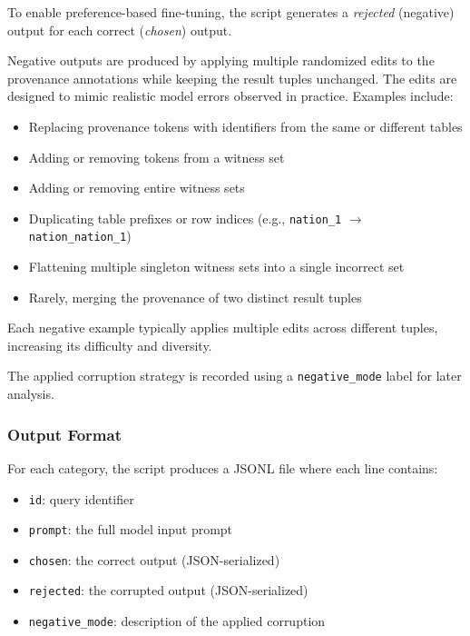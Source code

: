 \documentclass{article}
\begin{document}
To enable preference-based fine-tuning, the script generates a \emph{rejected} (negative) output for each correct (\emph{chosen}) output.

Negative outputs are produced by applying multiple randomized edits to the provenance annotations while keeping the result tuples unchanged.
The edits are designed to mimic realistic model errors observed in practice. Examples include:

\begin{itemize}
    \item Replacing provenance tokens with identifiers from the same or different tables
    \item Adding or removing tokens from a witness set
    \item Adding or removing entire witness sets
    \item Duplicating table prefixes or row indices (e.g., \texttt{nation\_1} $\rightarrow$ \texttt{nation\_nation\_1})
    \item Flattening multiple singleton witness sets into a single incorrect set
    \item Rarely, merging the provenance of two distinct result tuples
\end{itemize}

Each negative example typically applies multiple edits across different tuples, increasing its difficulty and diversity.

The applied corruption strategy is recorded using a \texttt{negative\_mode} label for later analysis.

\subsubsection{Output Format}

For each category, the script produces a JSONL file where each line contains:

\begin{itemize}
    \item \texttt{id}: query identifier
    \item \texttt{prompt}: the full model input prompt
    \item \texttt{chosen}: the correct output (JSON-serialized)
    \item \texttt{rejected}: the corrupted output (JSON-serialized)
    \item \texttt{negative\_mode}: description of the applied corruption
\end{itemize}
\end{document}
